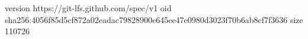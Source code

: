 version https://git-lfs.github.com/spec/v1
oid sha256:4056f85d5cf872a02eadac79828900e645ee47e0980d3023f70b6ab8cf7f3636
size 110726
